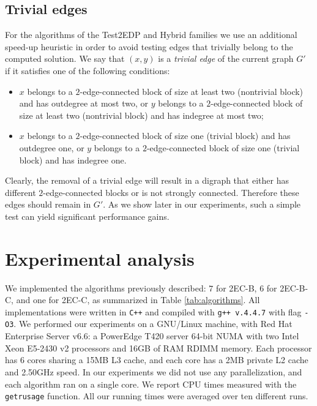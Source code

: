 \documentclass[11pt]{article}
\begin{document}
\subsection{Trivial edges}
\label{sec:add-speed-up}

For the algorithms of the \textsf{Test2EDP} and \textsf{Hybrid} families
we use an additional speed-up heuristic in order to avoid testing edges that trivially
belong to the computed solution. We say that $(x,y)$ is a  \emph{trivial edge} of the current graph $G'$ if
it satisfies one of the following conditions:
\begin{itemize}
\item $x$ belongs to a $2$-edge-connected block of size at least two (nontrivial block) and has outdegree at most two,
    or $y$ belongs to a $2$-edge-connected block of size at least two (nontrivial block) and has indegree at most two;
\item $x$ belongs to a $2$-edge-connected block of size one (trivial block) and has outdegree one,
    or $y$ belongs to a $2$-edge-connected block of size one (trivial block) and has indegree one.
\end{itemize}
Clearly, the removal of a trivial edge will result in a digraph that either has different $2$-edge-connected blocks
or is not strongly connected.
Therefore these edges should remain in $G'$.
As we show later in our experiments, such a simple test can yield significant performance gains.


\section{Experimental analysis}
\label{sec:experimental}

We implemented the algorithms previously described: $7$ for \textsf{2EC-B}, $6$  for \textsf{2EC-B-C}, and one for \textsf{2EC-C}, as summarized in Table \ref{tab:algorithms}.
All implementations were written in {\tt C++} and compiled with {\tt g++ v.4.4.7} with flag {\tt -O3}.
We performed our experiments on a GNU/Linux machine, with Red Hat Enterprise Server v6.6: a PowerEdge T420 server 64-bit NUMA
with two Intel Xeon E5-2430 v2 processors  and 16GB of RAM RDIMM memory. Each processor has 6 cores sharing a 15MB L3 cache, and each core has a 2MB private L2 cache and 2.50GHz speed. In our experiments we did not use any parallelization, and each algorithm ran on a single core.
We report CPU times measured with the \texttt{getrusage} function. All our running times were averaged over ten different runs.
\end{document}
